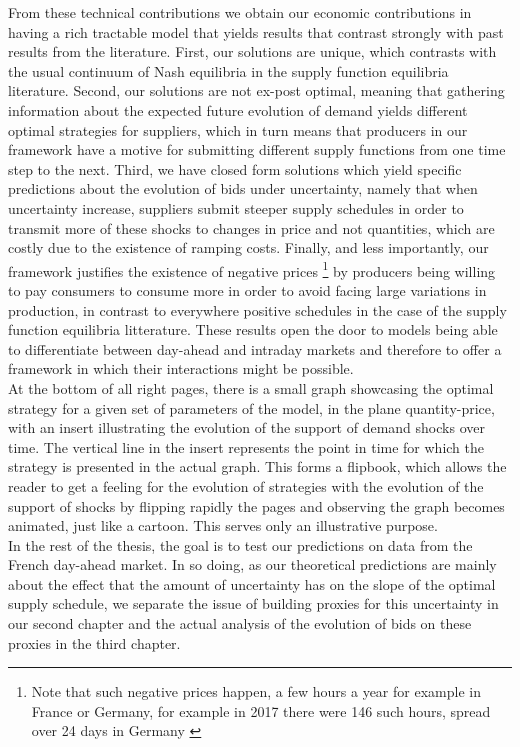 From these technical contributions we obtain our economic contributions in having a rich tractable model that yields results that contrast strongly with past results from the literature. First, our solutions are unique, which contrasts with the usual continuum of Nash equilibria in the supply function equilibria literature. Second, our solutions are not ex-post optimal, meaning that gathering information about the expected future evolution of demand yields different optimal strategies for suppliers, which in turn means that producers in our framework have a motive for submitting different supply functions from one time step to the next. Third, we have closed form solutions which yield specific predictions about the evolution of bids under uncertainty, namely that when uncertainty increase, suppliers submit steeper supply schedules in order to transmit more of these shocks to changes in price and not quantities, which are costly due to the existence of ramping costs. Finally, and less importantly, our framework justifies the existence of negative prices \footnote{Note that such negative prices happen, a few hours a year for example in France or Germany, for example in 2017 there were 146 such hours, spread over 24 days in Germany \cite{epexnegP}} by producers being willing to pay consumers to consume more in order to avoid facing large variations in production, in contrast to everywhere positive schedules in the case of the supply function equilibria litterature. These results open the door to models being able to differentiate between day-ahead and intraday markets and therefore to offer a framework in which their interactions might be possible.\\

At the bottom of all right pages, there is a small graph showcasing the optimal strategy for a given set of parameters of the model, in the plane quantity-price, with an insert illustrating the evolution of the support of demand shocks over time. The vertical line in the insert represents the point in time for which the strategy is presented in the actual graph. This forms a flipbook, which allows the reader to get a feeling for the evolution of strategies with the evolution of the support of shocks by flipping rapidly the pages and observing the graph becomes animated, just like a cartoon. This serves only an illustrative purpose. \\

In the rest of the thesis, the goal is to test our predictions on data from the French day-ahead market. In so doing, as our theoretical predictions are mainly about the effect that the amount of uncertainty has on the slope of the optimal supply schedule, we separate the issue of building proxies for this uncertainty in our second chapter and the actual analysis of the evolution of bids on these proxies in the third chapter.\\

